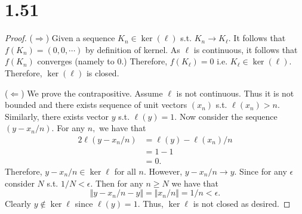 \documentclass[10pt]{article}
\begin{document}
\section*{1.51}

\begin{proof}
    ($\Rightarrow$) Given a sequence $K_n \in\ker(\ell)$ s.t. $K_n \to K_\ell.$ It follows that $f(K_n) = (0,0,\cdots)$ by definition of kernel. As $\ell$ is continuous, it follows that $f(K_n)$ converges (namely to $0$.) Therefore, $f(K_\ell) = 0$ i.e. $K_\ell \in\ker(\ell).$ Therefore, $\ker(\ell)$ is closed.

    ($\Leftarrow$) We prove the contrapositive. Assume $\ell$ is not continuous. Thus it is not bounded and there exists sequence of unit vectors $(x_n)$ s.t. $\ell(x_n) > n.$ Similarly, there exists vector $y$ s.t. $\ell(y)=1.$
    Now consider the sequence $(y-x_n/n).$ For any $n,$ we have that
    \begin{alignat*}{2}
        \ell(y-x_n/n) &= \ell(y) - \ell(x_n)/n\\
        &= 1 - 1\\
        &= 0.
    \end{alignat*}
    Therefore, $y-x_n/n\in\ker{\ell}$ for all $n.$ However, $y-x_n/n\to y.$ Since for any $\epsilon$ consider $N$ s.t. $1/N < \epsilon.$ Then for any $n\ge N$ we have that
    \[\Vert y-x_n/n -y\Vert = \Vert x_n/n\Vert = 1/n < \epsilon.\]
    Clearly $y\notin\ker{\ell}$ since $\ell(y)=1.$ Thus, $\ker{\ell}$ is not closed as desired.
 \end{proof}
\end{document}
